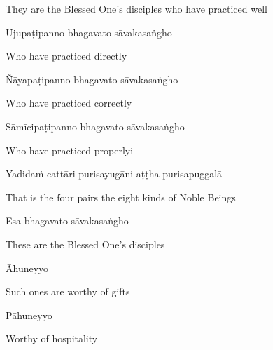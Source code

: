 \begin{english}
  They are the Blessed One's disciples who have practiced well
\end{english}

Ujupaṭipanno bhagavato sāvakasaṅgho

\begin{english}
  Who have practiced directly\hyperlink{endnote5-appendix}{\hypertarget{endnote5-body}{}}
\end{english}

Ñāyapaṭipanno bhagavato sāvakasaṅgho\hyperlink{endnote6-appendix}{\hypertarget{endnote6-body}{}}

\begin{english}
  Who have practiced correctly\hyperlink{endnote7-appendix}{\hypertarget{endnote7-body}{}}
\end{english}

Sāmīcipaṭipanno bhagavato sāvakasaṅgho

\begin{english}
  Who have practiced properlyi
\end{english}

Yadidaṁ cattāri purisayugāni aṭṭha purisapuggalā

\begin{english}
  That is the four pairs the eight kinds of Noble Beings
\end{english}

Esa bhagavato sāvakasaṅgho

\begin{english}
  These are the Blessed One's disciples
\end{english}

Āhuneyyo

\begin{english}
  Such ones are worthy of gifts
\end{english}

Pāhuneyyo

\begin{english}
  Worthy of hospitality
\end{english}

